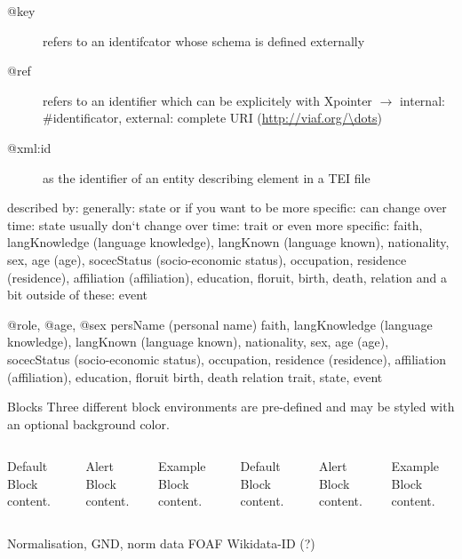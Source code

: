 \begin{description}
     \item[@key] refers to an identifcator whose schema is defined externally
     \item[@ref] refers to an identifier which can be explicitely with Xpointer $\to$ internal: \#identificator, external: complete URI (\protect\url{http://viaf.org/\dots})
     \item[@xml:id] as the identifier of an entity describing element in a TEI file
\end{description}

described by:
generally: state
or if you want to be more specific:
can change over time: state
usually don‘t change over time: trait
or even more specific:
faith, langKnowledge (language knowledge), langKnown (language known), nationality, sex, age (age), socecStatus (socio-economic status), occupation, residence (residence), affiliation (affiliation), education, floruit, birth, death, relation
and a bit outside of these: event


@role, @age, @sex
persName (personal name)
faith, langKnowledge (language knowledge), langKnown (language known), nationality, sex, age (age), socecStatus (socio-economic status), occupation, residence (residence), affiliation (affiliation), education, floruit
birth, death
relation
trait, state, event

\begin{frame}{Blocks}
  Three different block environments are pre-defined and may be styled with an
  optional background color.

  \begin{columns}[T,onlytextwidth]
      \begin{block}{Default}
        Block content.
      \end{block}

      \begin{alertblock}{Alert}
        Block content.
      \end{alertblock}

      \begin{exampleblock}{Example}
        Block content.
      \end{exampleblock}



      \begin{block}{Default}
        Block content.
      \end{block}

      \begin{alertblock}{Alert}
        Block content.
      \end{alertblock}

      \begin{exampleblock}{Example}
        Block content.
      \end{exampleblock}

  \end{columns}
\end{frame}
Normalisation, GND, norm data
FOAF
Wikidata-ID (?)

